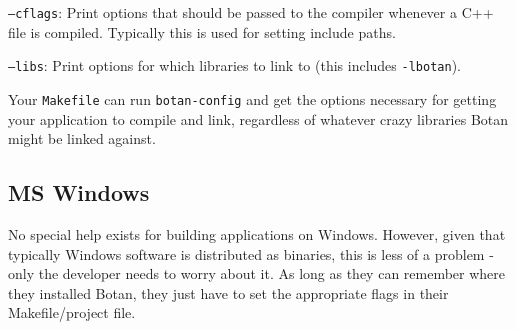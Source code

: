\documentclass{article}
\newcommand{\filename}[1]{\texttt{#1}}
\begin{document}
\texttt{--cflags}: Print options that should be passed to the compiler whenever
a C++ file is compiled. Typically this is used for setting include paths.

\texttt{--libs}: Print options for which libraries to link to (this includes
\texttt{-lbotan}).

Your \filename{Makefile} can run \filename{botan-config} and get the options
necessary for getting your application to compile and link, regardless of
whatever crazy libraries Botan might be linked against.

\subsection{MS Windows}

No special help exists for building applications on Windows. However, given
that typically Windows software is distributed as binaries, this is less of a
problem - only the developer needs to worry about it. As long as they can
remember where they installed Botan, they just have to set the appropriate
flags in their Makefile/project file.
\end{document}
